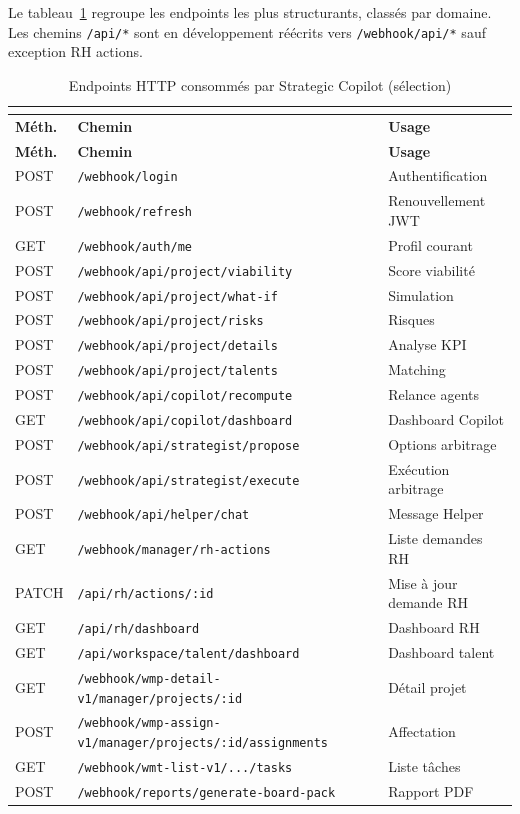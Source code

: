 Le tableau~\ref{tab:endpoints-ch4} regroupe les endpoints les plus structurants, classés par domaine. Les chemins \texttt{/api/*} sont en développement réécrits vers \texttt{/webhook/api/*} sauf exception RH actions.

\begin{longtable}{@{}p{1.1cm}p{5.2cm}p{6.7cm}@{}}
\caption{Endpoints HTTP consommés par Strategic Copilot (sélection)} \\
\label{tab:endpoints-ch4} \\
\toprule
\textbf{Méth.} & \textbf{Chemin} & \textbf{Usage} \\
\midrule
\endfirsthead
\toprule
\textbf{Méth.} & \textbf{Chemin} & \textbf{Usage} \\
\midrule
\endhead
POST & \texttt{/webhook/login} & Authentification \\
POST & \texttt{/webhook/refresh} & Renouvellement JWT \\
GET & \texttt{/webhook/auth/me} & Profil courant \\
POST & \texttt{/webhook/api/project/viability} & Score viabilité \\
POST & \texttt{/webhook/api/project/what-if} & Simulation \\
POST & \texttt{/webhook/api/project/risks} & Risques \\
POST & \texttt{/webhook/api/project/details} & Analyse KPI \\
POST & \texttt{/webhook/api/project/talents} & Matching \\
POST & \texttt{/webhook/api/copilot/recompute} & Relance agents \\
GET & \texttt{/webhook/api/copilot/dashboard} & Dashboard Copilot \\
POST & \texttt{/webhook/api/strategist/propose} & Options arbitrage \\
POST & \texttt{/webhook/api/strategist/execute} & Exécution arbitrage \\
POST & \texttt{/webhook/api/helper/chat} & Message Helper \\
GET & \texttt{/webhook/manager/rh-actions} & Liste demandes RH \\
PATCH & \texttt{/api/rh/actions/:id} & Mise à jour demande RH \\
GET & \texttt{/api/rh/dashboard} & Dashboard RH \\
GET & \texttt{/api/workspace/talent/dashboard} & Dashboard talent \\
GET & \texttt{/webhook/wmp-detail-v1/manager/projects/:id} & Détail projet \\
POST & \texttt{/webhook/wmp-assign-v1/manager/projects/:id/assignments} & Affectation \\
GET & \texttt{/webhook/wmt-list-v1/.../tasks} & Liste tâches \\
POST & \texttt{/webhook/reports/generate-board-pack} & Rapport PDF \\
\bottomrule
\end{longtable}

